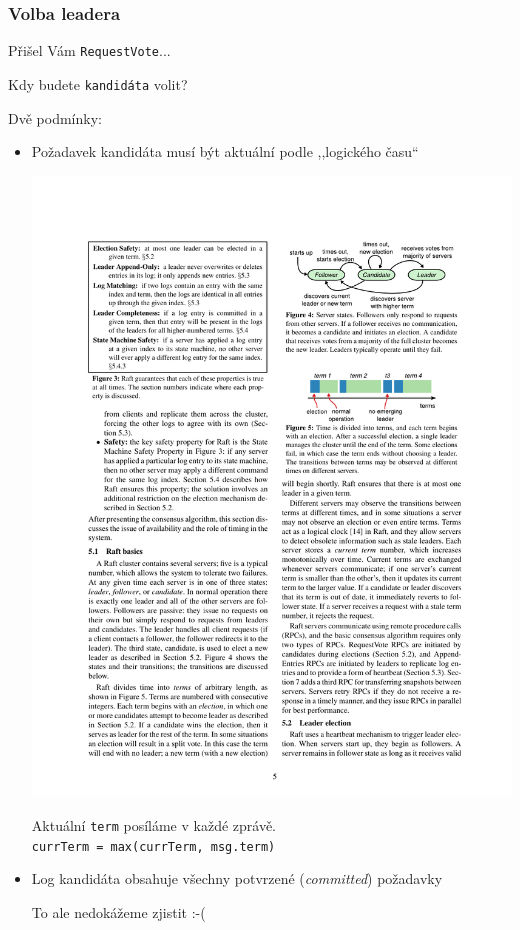 \documentclass[usenames,dvipsnames,9pt]{beamer}
\begin{document}
\begin{frame}
  \frametitle{Volba leadera}

  Přišel Vám \texttt{RequestVote}...
  \begin{center}
    \LARGE Kdy budete \texttt{kandidáta} volit?
  \end{center}

  \pause
  \vspace{2em}
  {\LARGE Dvě podmínky:}
  \begin{itemize}
    \item Požadavek kandidáta musí být aktuální podle ,,logického času``
          \begin{center}
            \includegraphics[width=0.5\linewidth]{12/figs/terms.pdf}

            Aktuální \texttt{term} posíláme v každé zprávě.\\
            \texttt{currTerm = max(currTerm, msg.term)}
          \end{center}

    \vspace{1em}

    \pause
    \item Log kandidáta obsahuje všechny potvrzené (\emph{committed}) požadavky

          \pause\hfill To ale nedokážeme zjistit :-(
  \end{itemize}
\end{frame}
\end{document}
